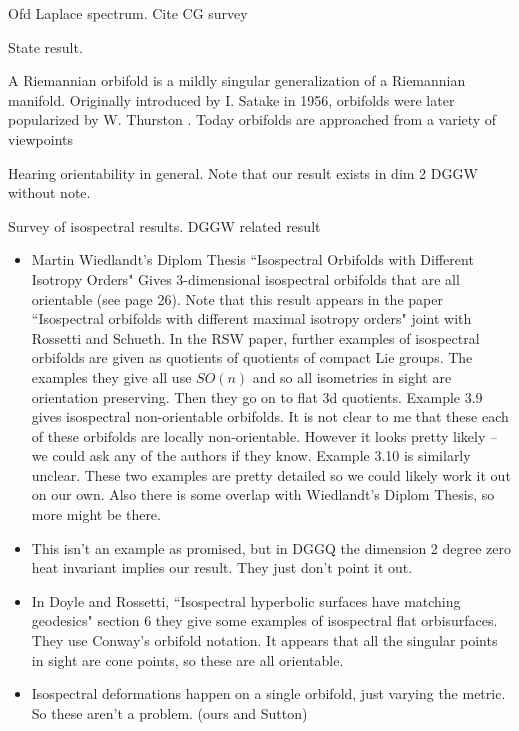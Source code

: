 \documentclass{amsart}
\theoremstyle{plain}
\theoremstyle{definition}
\theoremstyle{remark}
\begin{document}
Ofd Laplace spectrum.  Cite CG survey

State result.



A Riemannian orbifold is a mildly singular generalization of a Riemannian manifold.  Originally introduced by I. Satake \cite{Satake56} in 1956, orbifolds were later popularized by W. Thurston \cite{Th}.  
Today orbifolds are approached from a variety of viewpoints

Hearing orientability in general.  Note that our result exists in dim 2 DGGW without note.

Survey of isospectral results.  DGGW related result

\begin{itemize}
\item Martin Wiedlandt's Diplom Thesis ``Isospectral Orbifolds with Different Isotropy Orders"  Gives 3-dimensional isospectral orbifolds that are all orientable (see page 26).  Note that this result appears in the paper ``Isospectral orbifolds with different maximal isotropy orders" joint with Rossetti and Schueth.  In the RSW paper, further examples of isospectral orbifolds are given as quotients of quotients of compact Lie groups.  The examples they give all use $SO(n)$ and so all isometries in sight are orientation preserving.  Then they go on to flat 3d quotients. Example 3.9 gives isospectral non-orientable orbifolds.  It is not clear to me that these each of these orbifolds are locally non-orientable.  However it looks pretty likely -- we could ask any of the authors if they know.  Example 3.10 is similarly unclear.  These two examples are pretty detailed so we could likely work it out on our own.  Also there is some overlap with Wiedlandt's Diplom Thesis, so more might be there.
\item This isn't an example as promised, but in DGGQ the dimension 2 degree zero heat invariant implies our result.  They just don't point it out.
\item In Doyle and Rossetti, ``Isospectral hyperbolic surfaces have matching geodesics" section 6 they give some examples of isospectral flat orbisurfaces.  They use Conway's orbifold notation.  It appears that all the singular points in sight are cone points, so these are all orientable.
\item Isospectral deformations happen on a single orbifold, just varying the metric.  So these aren't a problem.  (ours and Sutton)  

\end{itemize}
\end{document}
